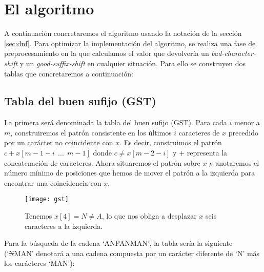 \section{El algoritmo}
A continuación concretaremos el algoritmo usando la notación de la sección \ref{sec:dnf}. Para optimizar la implementación del algoritmo, se realiza una fase de preprocesamiento en la que calculamos el valor que devolvería un \textit{bad-character-shift} y un \textit{good-suffix-shift} en cualquier situación. Para ello se construyen  dos tablas que concretaremos a continuación:\\

\subsection{Tabla del buen sufijo (GST)}
La primera será denominada la tabla del buen sufijo (GST). Para cada $i$ menor a $m$, construiremos el patrón consistente en los últimos $i$ caracteres de $x$ precedido por un carácter no coincidente con $x$. Es decir, construimos el patrón $c + x[m-1-i \ \ ...\ \ m-1]$ donde $c \neq x[m-2 -i]$ y $+$ representa la concatenación de caracteres. Ahora situaremos el patrón sobre $x$ y anotaremos el número mínimo de posiciones que hemos de mover el patrón a la izquierda para encontrar una coincidencia con $x$.\\

\begin{figure}[H]
  \centering
    \texttt{[image: gst]}
  \caption{Tenemos $x[4] = N \neq A$, lo que nos obliga a desplazar $x$ seis caracteres a la izquierda.}
	\label{gst}
\end{figure}

Para la búsqueda de la cadena `ANPANMAN', la tabla sería la siguiente (`\sout{N}MAN' denotará a una cadena compuesta por un carácter diferente de `N' más los carácteres `MAN'): 


